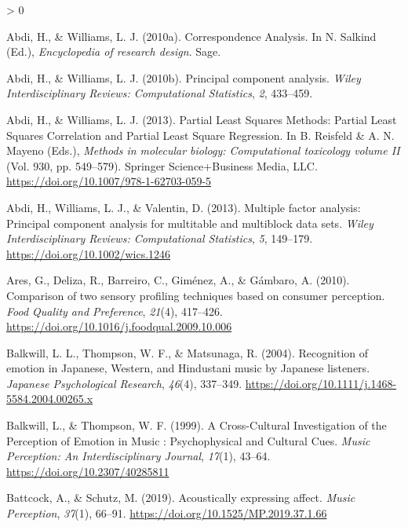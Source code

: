 \documentclass[
  english,
  man,floatsintext]{apa6}
\newlength{\cslhangindent}
\newenvironment{CSLReferences}[2] %
 {%
  \setlength{\parindent}{0pt}
  \ifodd #1 \everypar{\setlength{\hangindent}{\cslhangindent}}\ignorespaces\fi
  \ifnum #2 > 0
  \setlength{\parskip}{#2\baselineskip}
  \fi
 }%
 {}
\begin{document}
\hypertarget{refs}{}
\begin{CSLReferences}{1}{0}
\leavevmode\hypertarget{ref-Abdi2010d}{}%
Abdi, H., \& Williams, L. J. (2010a). {Correspondence Analysis}. In N. Salkind (Ed.), \emph{Encyclopedia of research design}. Sage.

\leavevmode\hypertarget{ref-Abdi2010f}{}%
Abdi, H., \& Williams, L. J. (2010b). {Principal component analysis}. \emph{Wiley Interdisciplinary Reviews: Computational Statistics}, \emph{2}, 433--459.

\leavevmode\hypertarget{ref-Abdi2013a}{}%
Abdi, H., \& Williams, L. J. (2013). {Partial Least Squares Methods: Partial Least Squares Correlation and Partial Least Square Regression}. In B. Reisfeld \& A. N. Mayeno (Eds.), \emph{Methods in molecular biology: Computational toxicology volume II} (Vol. 930, pp. 549--579). Springer Science+Business Media, LLC. \url{https://doi.org/10.1007/978-1-62703-059-5}

\leavevmode\hypertarget{ref-Abdi2013}{}%
Abdi, H., Williams, L. J., \& Valentin, D. (2013). {Multiple factor analysis: Principal component analysis for multitable and multiblock data sets}. \emph{Wiley Interdisciplinary Reviews: Computational Statistics}, \emph{5}, 149--179. \url{https://doi.org/10.1002/wics.1246}

\leavevmode\hypertarget{ref-Ares2010}{}%
Ares, G., Deliza, R., Barreiro, C., Giménez, A., \& Gámbaro, A. (2010). {Comparison of two sensory profiling techniques based on consumer perception}. \emph{Food Quality and Preference}, \emph{21}(4), 417--426. \url{https://doi.org/10.1016/j.foodqual.2009.10.006}

\leavevmode\hypertarget{ref-Balkwill2004}{}%
Balkwill, L. L., Thompson, W. F., \& Matsunaga, R. (2004). {Recognition of emotion in Japanese, Western, and Hindustani music by Japanese listeners}. \emph{Japanese Psychological Research}, \emph{46}(4), 337--349. \url{https://doi.org/10.1111/j.1468-5584.2004.00265.x}

\leavevmode\hypertarget{ref-Balkwill1999}{}%
Balkwill, L., \& Thompson, W. F. (1999). {A Cross-Cultural Investigation of the Perception of Emotion in Music : Psychophysical and Cultural Cues}. \emph{Music Perception: An Interdisciplinary Journal}, \emph{17}(1), 43--64. \url{https://doi.org/10.2307/40285811}

\leavevmode\hypertarget{ref-Battcock2019}{}%
Battcock, A., \& Schutz, M. (2019). {Acoustically expressing affect}. \emph{Music Perception}, \emph{37}(1), 66--91. \url{https://doi.org/10.1525/MP.2019.37.1.66}


\end{CSLReferences}
\end{document}
